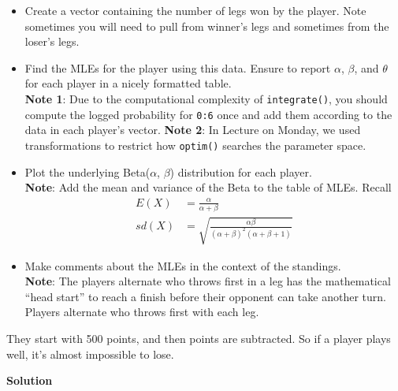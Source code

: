 \documentclass[
]{article}
\providecommand{\tightlist}{%
  \setlength{\itemsep}{0pt}\setlength{\parskip}{0pt}}
\begin{document}
\begin{itemize}
\tightlist
\item
  Create a vector containing the number of legs won by the player. Note
  sometimes you will need to pull from winner's legs and sometimes from
  the loser's legs.
\item
  Find the MLEs for the player using this data. Ensure to report
  \(\alpha\), \(\beta\), and \(\theta\) for each player in a nicely
  formatted table.\\
  \textbf{Note 1}: Due to the computational complexity of
  \texttt{integrate()}, you should compute the logged probability for
  \texttt{0:6} once and add them according to the data in each player's
  vector. \textbf{Note 2}: In Lecture on Monday, we used transformations
  to restrict how \texttt{optim()} searches the parameter space.
\item
  Plot the underlying Beta(\(\alpha\), \(\beta\)) distribution for each
  player.\\
  \textbf{Note}: Add the mean and variance of the Beta to the table of
  MLEs. Recall \begin{align*}
   E(X)   &= \frac{\alpha}{\alpha+\beta}\\
   sd(X) &= \sqrt{\frac{\alpha\beta}{(\alpha+\beta)^2(\alpha+\beta+1)}}
  \end{align*}
\item
  Make comments about the MLEs in the context of the standings.\\
  \textbf{Note}: The players alternate who throws first in a leg has the
  mathematical ``head start'' to reach a finish before their opponent
  can take another turn. Players alternate who throws first with each
  leg.
\end{itemize}

They start with 500 points, and then points are subtracted. So if a
player plays well, it's almost impossible to lose.

\textbf{Solution}

\normalsize
\end{document}
